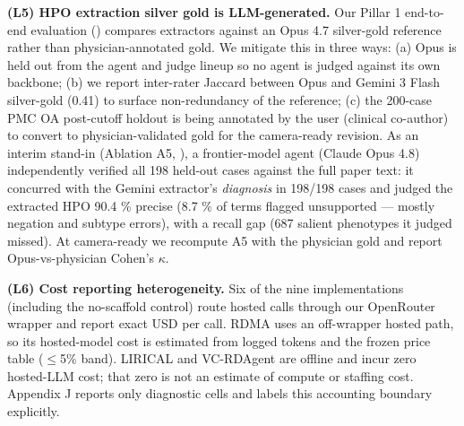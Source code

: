 \textbf{(L5) HPO extraction silver gold is LLM-generated.} Our Pillar 1
end-to-end evaluation () compares extractors against an Opus 4.7
silver-gold reference rather than physician-annotated gold. We mitigate
this in three ways: (a) Opus is held out from the agent and judge
lineup so no agent is judged against its own backbone; (b) we report
inter-rater Jaccard between Opus and Gemini 3 Flash silver-gold (0.41)
to surface non-redundancy of the reference; (c) the 200-case PMC OA
post-cutoff holdout is being annotated by the user (clinical co-author)
to convert to physician-validated gold for the camera-ready revision.
As an interim stand-in (Ablation A5, ), a frontier-model agent (Claude Opus 4.8) independently verified all 198 held-out cases against
the full paper text: it concurred with the Gemini extractor's \emph{diagnosis}
in 198/198 cases and judged the extracted HPO 90.4 \% precise
(8.7 \% of terms flagged unsupported --- mostly negation and subtype errors),
with a recall gap (687 salient phenotypes it judged missed). At
camera-ready we recompute A5 with the physician gold and report
Opus-vs-physician Cohen's \ensuremath{\kappa}.

\textbf{(L6) Cost reporting heterogeneity.} Six of the nine implementations
(including the no-scaffold control) route hosted calls through our OpenRouter
wrapper and report exact USD per call. RDMA uses an off-wrapper hosted path,
so its hosted-model cost is estimated from logged tokens and the frozen price
table (\ensuremath{\leq}5\% band). LIRICAL and VC-RDAgent are offline and incur zero hosted-LLM
cost; that zero is not an estimate of compute or staffing cost. Appendix J
reports only diagnostic cells and labels this accounting boundary explicitly.


